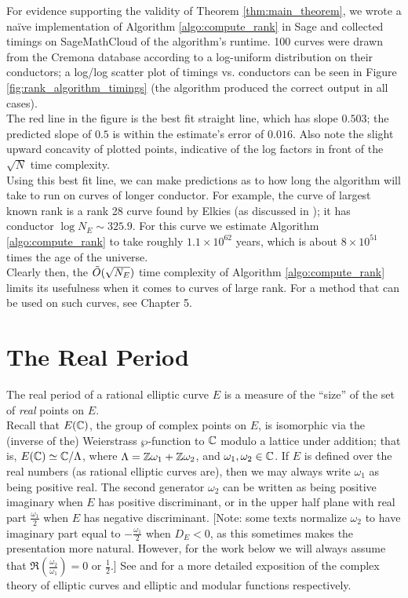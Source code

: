 For evidence supporting the validity of Theorem \ref{thm:main_theorem}, we wrote a na\"{i}ve implementation of Algorithm \ref{algo:compute_rank} in Sage and collected timings on SageMathCloud of the algorithm's runtime. 100 curves were drawn from the Cremona database according to a log-uniform distribution on their conductors; a log/log scatter plot of timings vs. conductors can be seen in Figure \ref{fig:rank_algorithm_timings} (the algorithm produced the correct output in all cases). \\

The red line in the figure is the best fit straight line, which has slope $0.503$; the predicted slope of $0.5$ is within the estimate's error of $0.016$. Also note the slight upward concavity of plotted points, indicative of the log factors in front of the $\sqrt{N}$ time complexity. \\

Using this best fit line, we can make predictions as to how long the algorithm will take to run on curves of longer conductor. For example, the curve of largest known rank is a rank 28 curve found by Elkies (as discussed in \cite{Bob-2011}); it has conductor $\log N_E \sim 325.9$. For this curve we estimate Algorithm \ref{algo:compute_rank} to take roughly $1.1\times 10^{62}$ years, which is about $8\times 10^{51}$ times the age of the universe. \\

Clearly then, the $\tilde{O}(\sqrt{N_E})$ time complexity of Algorithm \ref{algo:compute_rank} limits its usefulness when it comes to curves of large rank. For a method that can be used on such curves, see Chapter 5.

\newpage
\section{The Real Period}

The real period of a rational elliptic curve $E$ is a measure of the ``size'' of the set of {\it real} points on $E$. \\

Recall that $E(\mathbb{C})$, the group of complex points on $E$, is isomorphic via the (inverse of the) Weierstrass $\wp$-function to $\mathbb{C}$ modulo a lattice under addition; that is, $E(\mathbb{C}) \simeq \mathbb{C}/\Lambda$, where $\Lambda = \mathbb{Z}\omega_1 + \mathbb{Z}\omega_2$, and $\omega_1,\omega_2 \in \mathbb{C}$.
If $E$ is defined over the real numbers (as rational elliptic curves are), then we may always write $\omega_1$ as being positive real. The second generator $\omega_2$ can be written as being positive imaginary when $E$ has positive discriminant, or in the upper half plane with real part $\frac{\omega_1}{2}$ when $E$ has negative discriminant. [Note: some texts normalize $\omega_2$ to have imaginary part equal to $-\frac{\omega_1}{2}$ when $D_E<0$, as this sometimes makes the presentation more natural. However, for the work below we will always assume that $\Re(\frac{\omega_2}{\omega_1}) = 0$ or $\frac{1}{2}$.] See \cite[Ch. VI]{Sil-1985} and \cite[Ch. I]{Sil-1994} for a more detailed exposition of the complex theory of elliptic curves and elliptic and modular functions respectively.

